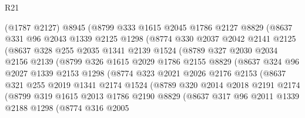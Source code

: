 \begin{lexlean}{R21}
\begin{coremodule}
            (@1787 @2127)
            @8945
            (@8799
              @333
              @1615
              @2045
              @1786
              @2127
              @8829
              (@8637
                @331
                @96
                @2043
                @1339
                @2125
                @1298
                (@8774
                  @330
                  @2037
                  @2042
                  @2141
                  @2125
                  (@8637
                    @328
                    @255
                    @2035
                    @1341
                    @2139
                    @1524
                    (@8789
                      @327
                      @2030
                      @2034
                      @2156
                      @2139
                      (@8799
                        @326
                        @1615
                        @2029
                        @1786
                        @2155
                        @8829
                        (@8637
                          @324
                          @96
                          @2027
                          @1339
                          @2153
                          @1298
                          (@8774
                            @323
                            @2021
                            @2026
                            @2176
                            @2153
                            (@8637
                              @321
                              @255
                              @2019
                              @1341
                              @2174
                              @1524
                              (@8789
                                @320
                                @2014
                                @2018
                                @2191
                                @2174
                                (@8799
                                  @319
                                  @1615
                                  @2013
                                  @1786
                                  @2190
                                  @8829
                                  (@8637
                                    @317
                                    @96
                                    @2011
                                    @1339
                                    @2188
                                    @1298
                                    (@8774
                                      @316
                                      @2005

\end{coremodule}
\end{lexlean}
